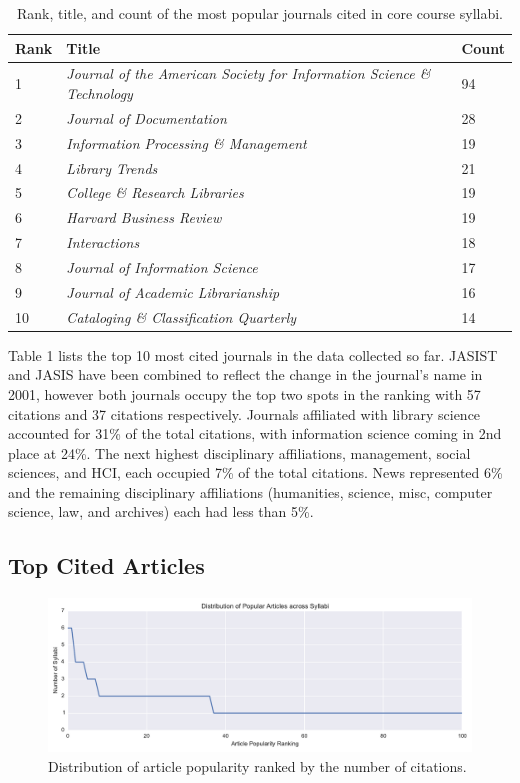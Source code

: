 \documentclass[10pt, letterpaper]{article}
\begin{document}
\begin{table}[h]

\begin{tabular}{lll}
\toprule
Rank & Title & Count \\
\midrule
1 & \textit{Journal of the American Society for Information Science \& Technology} & 94 \\
2 & \textit{Journal of Documentation} & 28 \\
3 & \textit{Information Processing \& Management} & 19 \\
4 & \textit{Library Trends} & 21 \\
5 & \textit{College \& Research Libraries} & 19 \\
6 & \textit{Harvard Business Review} & 19 \\
7 & \textit{Interactions} & 18 \\
8 & \textit{Journal of Information Science} & 17 \\
9 & \textit{Journal of Academic Librarianship} & 16 \\
10 & \textit{Cataloging \& Classification Quarterly} & 14 \\
\bottomrule
\end{tabular}
\caption{Rank, title, and count of the most popular journals cited in core course syllabi.}
\end{table}

Table 1 lists the top 10 most cited journals in the data collected so far. JASIST and JASIS have been combined to reflect the change in the journal's name in 2001, however both journals occupy the top two spots in the ranking with 57 citations and 37 citations respectively. Journals affiliated with library science accounted for 31\% of the total citations, with information science coming in 2nd place at 24\%. The next highest disciplinary affiliations, management, social sciences, and HCI, each occupied 7\% of the total citations. News represented 6\% and the remaining disciplinary affiliations (humanities, science, misc, computer science, law, and archives) each had less than 5\%.


\subsection{Top Cited Articles}

\begin{figure}[h]
\includegraphics[width=\textwidth]{popular-articles.pdf} 
\caption{Distribution of article popularity ranked by the number of citations.} 
\end{figure}
\end{document}

